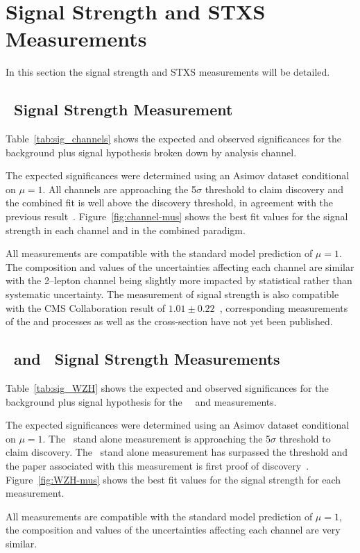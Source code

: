\clearpage

\section{Signal Strength and STXS Measurements}
In this section the signal strength and STXS measurements will be detailed.

\subsection{\VH\ Signal Strength Measurement}
Table~\ref{tab:sig_channels} shows the expected and observed significances for
the background plus signal hypothesis broken down by analysis channel.

The expected significances were determined using an Asimov dataset conditional
on $\mu=1$. All channels are approaching the 5$\sigma$ threshold to claim
discovery and the combined fit is well above the discovery threshold, in
agreement with the previous result~\cite{vhbb-obs}. Figure~\ref{fig:channel-mus}
shows the best fit values for the signal strength in each channel and in the
combined paradigm.

All measurements are compatible with the standard model prediction of $\mu=1$.
The composition and values of the uncertainties affecting each channel are
similar with the 2--lepton channel being slightly more impacted by statistical
rather than systematic uncertainty. The measurement of \VH signal strength is
also compatible with the CMS Collaboration result of $1.01 \pm
0.22$~\cite{CMS:hbb}, corresponding measurements of the \WH and \ZH processes as
well as the cross-section have not yet been published. 
% 
\clearpage
\subsection{\WH\ and \ZH\ Signal Strength Measurements}
Table~\ref{tab:sig_WZH} shows the expected and observed significances for
the background plus signal hypothesis for the \WH\, \ZH\ and \VH measurements.

The expected significances were determined using an Asimov dataset conditional
on $\mu=1$. The \WH\ stand alone measurement is approaching the 5$\sigma$
threshold to claim discovery. The \ZH\ stand alone measurement has surpassed the
threshold and the paper associated with this measurement is first proof of
discovery~\cite{final-paper}. Figure~\ref{fig:WZH-mus} shows the best fit values
for the signal strength for each measurement.

All measurements are compatible with the standard model prediction of $\mu=1$,
the composition and values of the uncertainties affecting each channel are very
similar.
\clearpage

